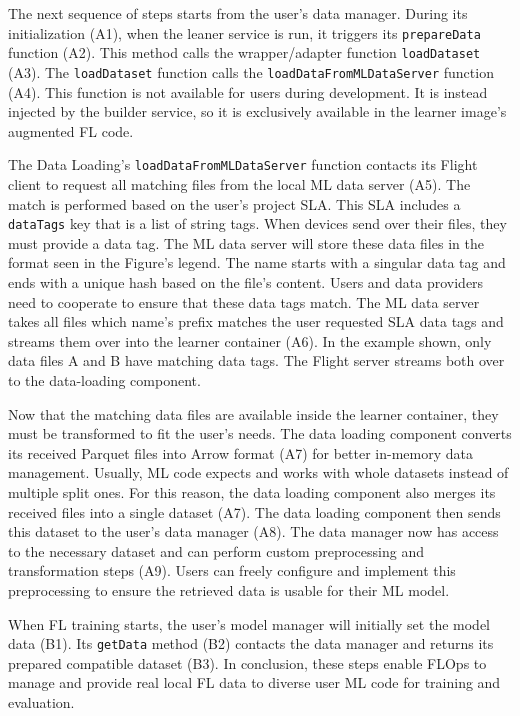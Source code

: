 The next sequence of steps starts from the user's data manager.
During its initialization (A1), when the leaner service is run, it triggers its \texttt{prepareData} function (A2).
This method calls the wrapper/adapter function \texttt{loadDataset} (A3).
The \texttt{loadDataset} function calls the \texttt{loadDataFromMLDataServer} function (A4).
This function is not available for users during development.
It is instead injected by the builder service, so it is exclusively available in the learner image's augmented FL code.

The Data Loading's \texttt{loadDataFromMLDataServer} function contacts its Flight client to request all matching files from the local ML data server (A5).
The match is performed based on the user's project SLA.
This SLA includes a \texttt{dataTags} key that is a list of string tags.
When devices send over their files, they must provide a data tag.
The ML data server will store these data files in the format seen in the Figure's legend.
The name starts with a singular data tag and ends with a unique hash based on the file's content.
Users and data providers need to cooperate to ensure that these data tags match.
The ML data server takes all files which name's prefix matches the user requested SLA data tags and streams them over into the learner container (A6).
In the example shown, only data files A and B have matching data tags.
The Flight server streams both over to the data-loading component.

Now that the matching data files are available inside the learner container, they must be transformed to fit the user's needs.
The data loading component converts its received Parquet files into Arrow format (A7) for better in-memory data management.
Usually, ML code expects and works with whole datasets instead of multiple split ones.
For this reason, the data loading component also merges its received files into a single dataset (A7).
The data loading component then sends this dataset to the user's data manager (A8).
The data manager now has access to the necessary dataset and can perform custom preprocessing and transformation steps (A9).
Users can freely configure and implement this preprocessing to ensure the retrieved data is usable for their ML model.

When FL training starts, the user's model manager will initially set the model data (B1).
Its \texttt{getData} method (B2) contacts the data manager and returns its prepared compatible dataset (B3).
In conclusion, these steps enable FLOps to manage and provide real local FL data to diverse user ML code for training and evaluation.